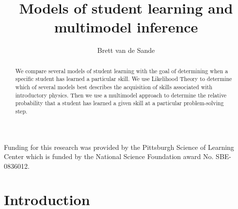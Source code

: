 \documentclass{acmlarge-edm}
\begin{document}
\title{Models of student learning and multimodel inference}
\author{Brett van de Sande
}

%

\begin{abstract}
We compare several models of student learning with the goal of
determining when a specific student has learned a particular skill.
We use Likelihood Theory to determine which of several models best
describes the acquisition of skills associated with introductory
physics.  Then we use a multimodel approach to determine the relative
probability that a student has learned a given skill at a particular
problem-solving step.
\end{abstract}





\begin{bottomstuff}
Funding for this research was provided by the Pittsburgh Science of
Learning Center which is funded by the National Science Foundation
award No. SBE-0836012.
\end{bottomstuff}


\maketitle


\section{Introduction}

%
%

\end{document}
